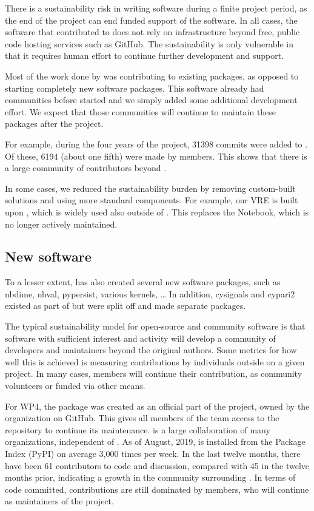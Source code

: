 \documentclass{deliverablereport}
\begin{document}
There is a sustainability risk in writing software during a finite project period,
as the end of the project can end funded support of the software.
In all cases, the software that \ODK contributed to does not rely on infrastructure
beyond free, public code hosting services such as GitHub.
The sustainability is only vulnerable
in that it requires human effort to continue further development and support.

Most of the work done by \ODK was contributing to existing packages,
as opposed to starting completely new software packages.
This software already had communities before \ODK started
and we simply added some additional development effort.
We expect that those communities will continue to maintain
these packages after the project.

For example, during the four years of the \ODK project,
31398 commits were added to \Sage.
Of these, 6194
(about one fifth)  %
were made by \ODK members.
This shows that there is a large community of contributors beyond \ODK.

In some cases, we reduced the sustainability burden by removing
custom-built solutions and using more standard components.
For example, our VRE is built upon \Jupyter, which is widely used
also outside of \ODK.
This replaces the \Sage Notebook, which is no longer actively maintained.

\subsection{New software}

To a lesser extent,
\ODK has also created several new software packages,
such as nbdime, nbval, pypersist, various \Jupyter kernels, \ldots
In addition, cysignals and cypari2 existed as part of \Sage but were split
off and made separate packages.

The typical sustainability model for open-source and community software
is that software with sufficient interest and activity will develop
a community of developers and maintainers beyond the original authors.
Some metrics for how well this is achieved is measuring contributions
by individuals outside \ODK on a given project.
In many cases, \ODK members will continue their contribution,
as community volunteers or funded via other means.

For WP4, the \nbdime package was created as an official part of the \Jupyter project,
owned by the \Jupyter organization on GitHub.
This gives all members of the \Jupyter team access to the repository to continue its maintenance.
\Jupyter is a large collaboration of many organizations, independent of \ODK.
As of August, 2019, \nbdime is installed from the \Python Package Index (PyPI) on average 3,000 times per week.
In the last twelve months, there have been 61 contributors to code and discussion, compared with 45 in the twelve months prior,
indicating a growth in the community surrounding \nbdime.
In terms of code committed, contributions are still dominated by \ODK members,
who will continue as maintainers of the project.
\end{document}
